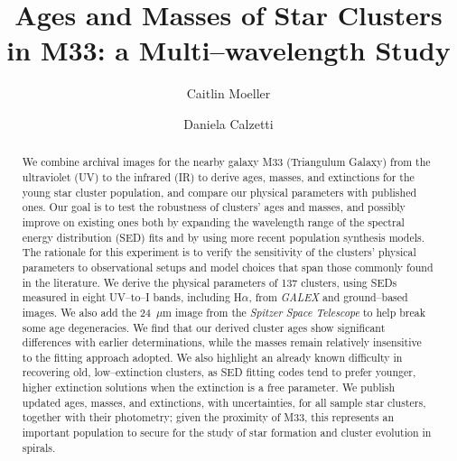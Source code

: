\documentclass{aastex63}
\begin{document}
\title{Ages and Masses of Star Clusters in M33: a Multi--wavelength Study}


\author[0000-0002-0786-7307]{Caitlin Moeller}

\author[0000-0002-5189-8004]{Daniela Calzetti}

\begin{abstract}
We combine archival images for the nearby galaxy M33 (Triangulum Galaxy) from the ultraviolet (UV) to the infrared (IR) to derive ages, masses, and extinctions for the young star cluster population, and compare our physical parameters with published ones. Our goal is to test the robustness of clusters’ ages and masses, and possibly improve on existing ones both by expanding the wavelength range of the spectral energy distribution (SED) fits and by using more recent population synthesis models. The rationale for this experiment is to verify the sensitivity of the clusters’ physical parameters to observational setups and model choices that span those commonly found in the literature. We derive the physical parameters of 137 clusters, using SEDs  measured in eight UV--to--I bands, including H$\alpha$, from \textit{GALEX} and ground--based images. We also add the 24~$\mu$m image from the \textit{Spitzer Space Telescope} to help break some age degeneracies. We find that our derived cluster ages show significant differences with earlier determinations, while the masses remain relatively insensitive to the fitting approach adopted. We also highlight an already known difficulty in recovering old, low--extinction clusters, as SED fitting codes tend to prefer younger, higher extinction solutions when the extinction is a free parameter. We publish updated ages, masses, and extinctions, with uncertainties, for all sample star clusters, together with their photometry; given the proximity of M33, this represents an important population to secure for the study of star formation and cluster evolution in spirals.
\end{abstract}
\end{document}
